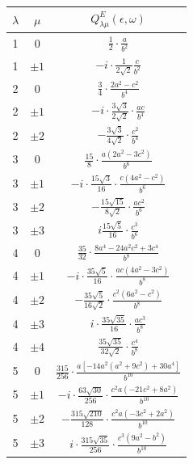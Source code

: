 \documentclass[10pt]{article}
\begin{document}
\begin{center}
\begin{tabular}{|c|c|c|}
\hline
$\lambda$ & $\mu$ & $Q_{\lambda \mu}^{E}(\epsilon, \omega)$ \\
\hline
1 & 0 & $\frac{1}{2} \cdot \frac{a}{b^{2}}$ \\
\hline
1 & $\pm 1$ & $-i \cdot \frac{1}{2 \sqrt{2}} \frac{c}{b^{2}}$ \\
\hline
2 & 0 & $\frac{3}{4} \cdot \frac{2 a^{2}-c^{2}}{b^{4}}$ \\
\hline
2 & $\pm 1$ & \( -i \cdot \frac{3 \sqrt{3}}{2 \sqrt{2}} \cdot \frac{a c}{b^{4}} \) \\
\hline
2 & $\pm 2$ & \( -\frac{3 \sqrt{3}}{4 \sqrt{2}} \cdot \frac{c^{2}}{b^{4}} \) \\
\hline
3 & 0 & \( \frac{15}{8} \cdot \frac{a\left(2 a^{2}-3 c^{2}\right)}{b^{6}} \) \\
\hline
3 & $\pm 1$ & \( -i \cdot \frac{15 \sqrt{3}}{16} \cdot \frac{c\left(4 a^{2}-c^{2}\right)}{b^{6}} \) \\
\hline
3 & $\pm 2$ & \( -\frac{15 \sqrt{15}}{8 \sqrt{2}} \cdot \frac{a c^{2}}{b^{6}} \) \\
\hline
3 & $\pm 3$ & $i \frac{15 \sqrt{5}}{16} \cdot \frac{c^{3}}{b^{6}}$ \\
\hline
4 & 0 & \( \frac{35}{32} \cdot \frac{8 a^{4}-24 a^{2} c^{2}+3 c^{4}}{b^{8}} \) \\
\hline
4 & $\pm 1$ & \( -i \cdot \frac{35 \sqrt{5}}{16} \cdot \frac{a c\left(4 a^{2}-3 c^{2}\right)}{b^{8}} \) \\
\hline
4 & $\pm 2$ & \( -\frac{35 \sqrt{5}}{16 \sqrt{2}} \cdot \frac{c^{2}\left(6 a^{2}-c^{2}\right)}{b^{8}} \) \\
\hline
4 & $\pm 3$ & \( i \cdot \frac{35 \sqrt{35}}{16} \cdot \frac{a c^{3}}{b^{8}} \) \\
\hline
4 & $\pm 4$ & \( \frac{35 \sqrt{35}}{32 \sqrt{2}} \cdot \frac{c^{4}}{b^{8}} \) \\
\hline
5 & 0 & \( \frac{315}{256} \cdot \frac{a\left[-14 a^{2}\left(a^{2}+9 c^{2}\right)+30 a^{4}\right]}{b^{10}} \) \\
\hline
5 & $\pm 1$ & \( -i \cdot \frac{63 \sqrt{30}}{256} \cdot \frac{c^{2} a\left(-21 c^{2}+8 a^{2}\right)}{b^{10}} \) \\
\hline
5 & $\pm 2$ & \( -\frac{315 \sqrt{210}}{128} \cdot \frac{c^{2} a\left(-3 c^{2}+2 a^{2}\right)}{b^{10}} \) \\
\hline
5 & $\pm 3$ & \( i \cdot \frac{315 \sqrt{35}}{256} \cdot \frac{c^{3}\left(9 a^{2}-b^{2}\right)}{b^{10}} \) \\

\end{tabular}
\end{center}
\end{document}
